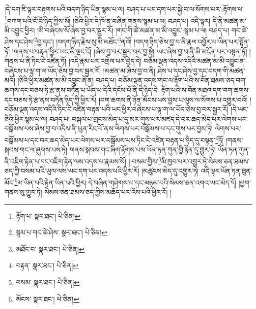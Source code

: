 །དེ་དག་ཇི་ལྟར་བརྟགས་པའི་བདག་ཉིད་ཡིན་སྙམ་པ་ལ། བཤད་པ་ཡང་དག་པར་སྐྱེ་བ་ལ་སོགས་པར་:རྟོགས་པ་\footnote{རྟོག་པ་  སྣར་ཐང་།  པེ་ཅིན། }བཀག་པའི་ངོ་བོ་ཉིད་ཀྱིས་སོ། །ཅིའི་ཕྱིར་དེ་ཁོ་ན་བཞིན་གནས་སྙམ་པ་ལ། བཤད་པ། འདི་ལྟར། དེ་ནི་མཚན་མ་མི་འབྱུང་ཕྱིར། །མི་བཞེངས་སོ་ཞེས་བྱ་བར་སྦྱར་རོ། །གང་གི་ཚེ་མཚན་མ་མི་འབྱུང་:སྙམ་པ་ལ། བཤད་པ། གང་ཚེ་ཤེས་དང་ཤེས་\footnote{སྙམ་པ་གང་ཚེ་ཤེས་  སྣར་ཐང་།  པེ་ཅིན། }བྱ་དང་། །བདག་ཉིད་རྗེས་སུ་མི་མཐོང་\footnote{མཐོང་བ་  སྣར་ཐང་།  པེ་ཅིན། }ནའོ། །བདག་ཉིད་ཅེས་བྱ་བ་ནི་རྣལ་འབྱོར་པ་ཡིན་པར་སྟོན་ཏོ། །གནས་པ་བརྟན་ཕྱིར་ཡང་མི་ལྡང་ངོ། །ཞེས་བྱ་བར་སྦྱར་བར་བྱ་སྟེ། ཡང་ཞེས་བྱ་བ་ནི་མི་མངོན་པར་བསྟན་ཏོ། །གནས་པ་ནི་ཏིང་ངེ་འཛིན་ཏོ། །འདི་རྣམ་པར་འགྲེལ་པར་བྱེད་དེ། བཅོམ་ལྡན་འདས་འདིའི་མཚན་མ་མི་འབྱུང་ན་བཞེངས་པ་ལྟ་ག་ལ་ཡོད་ཅེས་བྱ་བར་སྦྱར་རོ། །མཚན་མ་ཞེས་བྱ་བ་ནི། ཤེས་པ་དང་ཤེས་བྱ་དང་བདག་གི་མཚན་མའོ། །ཅིའི་ཕྱིར་མཚན་མ་མི་འབྱུང་ཞེ་ན། བཤད་པ། བཅོམ་ལྡན་འདས་གང་ལ་རྟོག་པའི་ས་བོན་ཐམས་ཅད་བག་ཆགས་དང་བཅས་ཏེ་རྩ་ནས་བཏོན་པ་ཡོད་པ་དེའི་དངོས་པོ་ནི་དེ་ཉིད་དེ། རྟོག་པའི་ས་བོན་མཐའ་དག་བག་ཆགས་དང་བཅས་ཏེ་རྩ་ནས་བཏོན་ཉིད་ཀྱི་ཕྱིར་རོ། །བག་ཆགས་ནི་ཉོན་མོངས་པས་བྱས་པ་ལུས་ལ་སོགས་པ་འགྱུར་བའོ། །བཅོམ་ལྡན་འདས་འདིའི་ཏིང་ངེ་འཛིན་བརྟན་པའི་ཡང་ཕྱིར་བཞེངས་པ་ལྟ་ག་ལ་ཡོད་ཅེས་བྱ་བར་སྦྱར་རོ། །དེ་ཡང་ཅིའི་ཕྱིར་སྙམ་པ་ལ། བཤད་པ། བསྐལ་པ་གྲངས་མེད་པ་དུ་མར་གུས་པར་མཛད་དེ་བར་ཆད་མེད་པར་ལེགས་པར་བསྒོམས་པས་ཞེས་བྱ་བ་འདིས་ནི་ཡུན་རིང་པོ་ནས་ལེགས་པར་བསྒོམས་པ་དང་གུས་པར་བྱས་ཏེ། ལེགས་པར་བསྒོམས་པ་དང་བར་ཆད་མེད་པར་ལེགས་པར་བསྒོམས་པས་ཏིང་ངེ་འཛིན་བརྟན་པ་ཉིད་དུ་བསྟན་\footnote{བརྟན་  སྣར་ཐང་།  པེ་ཅིན། }ཏོ། །གནས་སྐབས་གང་ལ་ཞུགས་པས་ཏེ། གནས་སྐབས་གང་ཞིག་རྟོགས་པས་ཡོན་ཏན་ཀུན་གྱི་རྟེན་དུ་གྱུར་ཏེ། ཡོན་ཏན་ཀུན་ནི་འཇིག་རྟེན་པ་དང་འཇིག་རྟེན་ལས་འདས་པ་རྣམས་སོ། །:བསམ་གྱིས་\footnote{བསམ་  སྣར་ཐང་།  པེ་ཅིན། }མི་ཁྱབ་པར་འགྱུར་ཏེ་སེམས་ཅན་ཐམས་ཅད་ཀྱི་བསམ་པའི་ཡུལ་ལས་ཡང་དག་པར་འདས་པའི་ཕྱིར་རོ། །མཚུངས་མེད་དུ་འགྱུར་ཏེ། འདི་ལྟར་ཡོན་ཏན་ཐུན་མོང་\footnote{མོངས་  སྣར་ཐང་།  པེ་ཅིན། }མ་ཡིན་པའི་རྟེན་ཡིན་པའི་ཕྱིར། དེ་བཞིན་གཤེགས་པ་དང་མཉམ་པའི་སེམས་ཅན་འགའ་ཡང་མེད་དོ། །ཕྱག་གནས་སུ་གྱུར་ཏེ། སེམས་ཅན་ཐམས་ཅད་ཀྱིས་མཆོད་པར་འོས་པའི་ཕྱིར་རོ། །
